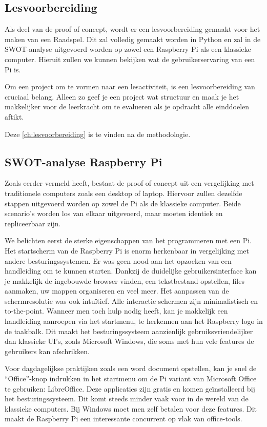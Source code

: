 \subsection{Lesvoorbereiding}
Als deel van de proof of concept, wordt er een lesvoorbereiding gemaakt voor het maken van een Raadspel. Dit zal volledig gemaakt worden in Python en zal in de SWOT-analyse uitgevoerd worden op zowel een Raspberry Pi als een klassieke computer. Hieruit zullen we kunnen bekijken wat de gebruikerservaring van een Pi is.

Om een project om te vormen naar een lesactiviteit, is een lesvoorbereiding van cruciaal belang. Alleen zo geef je een project wat structuur en maak je het makkelijker voor de leerkracht om te evalueren als je opdracht alle einddoelen aftikt.

Deze \ref{ch:lesvoorbereiding} is te vinden na de methodologie.

\subsection{SWOT-analyse Raspberry Pi}

Zoals eerder vermeld heeft, bestaat de proof of concept uit een vergelijking met traditionele computers zoals een desktop of laptop. Hiervoor zullen dezelfde stappen uitgevoerd worden op zowel de Pi als de klassieke computer. Beide scenario’s worden los van elkaar uitgevoerd, maar moeten identiek en repliceerbaar zijn.

We belichten eerst de sterke eigenschappen van het programmeren met een Pi. 
Het startscherm van de Raspberry Pi is enorm herkenbaar in vergelijking met andere besturingssystemen. Er was geen nood aan het opzoeken van een handleiding om te kunnen starten. Dankzij de duidelijke gebruikersinterface kan je makkelijk de ingebouwde browser vinden, een tekstbestand opstellen, files aanmaken, uw mappen organiseren en veel meer. Het aanpassen van de schermresolutie was ook intuïtief. Alle interactie schermen zijn minimalistisch en to-the-point. Wanneer men toch hulp nodig heeft, kan je makkelijk een handleiding aanroepen via het startmenu, te herkennen aan het Raspberry logo in de taakbalk. Dit maakt het besturingssysteem aanzienlijk gebruiksvriendelijker dan klassieke UI’s, zoals Microsoft Windows, die soms met hun vele features de gebruikers kan afschrikken.

Voor dagdagelijkse praktijken zoals een word document opstellen, kan je snel de “Office”-knop indrukken in het startmenu om de Pi variant van Microsoft Office te gebruiken: LibreOffice. Deze applicaties zijn gratis en komen geïnstalleerd bij het besturingssysteem. Dit komt steeds minder vaak voor in de wereld van de klassieke computers. Bij Windows moet men zelf betalen voor deze features. Dit maakt de Raspberry Pi een interessante concurrent op vlak van office-tools.

